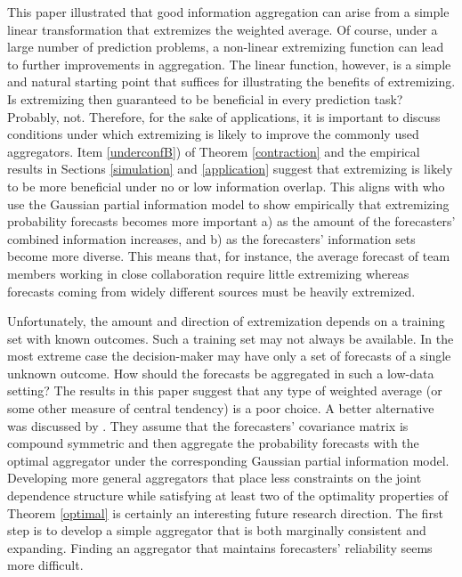 \documentclass[12pt]{article}
\theoremstyle{definition}
\theoremstyle{definition}
\begin{document}
This paper illustrated that good information aggregation can arise from a simple linear transformation that extremizes the weighted average. Of course, under a large number of prediction problems, a non-linear extremizing function can lead to further improvements in aggregation. The linear function, however, is a simple and natural starting point that suffices for illustrating the benefits of extremizing. Is extremizing then guaranteed to be beneficial in every prediction task? Probably, not. 
Therefore, for the sake of applications, it is important to discuss conditions under which extremizing is likely to improve the commonly used aggregators. Item \ref{underconfB}) of Theorem \ref{contraction} and the empirical results in Sections \ref{simulation} and \ref{application} suggest that extremizing is likely to be more beneficial under no or low information overlap. This aligns with  \cite{satopaamodeling} who use the Gaussian partial information model to show empirically that extremizing probability forecasts becomes more important a) as the amount of the forecasters' combined information increases, and b) as the forecasters' information sets become more diverse. This means that, for instance, the average forecast of team members working in close collaboration require little extremizing whereas forecasts coming from widely different sources must be heavily extremized.  




Unfortunately, the amount and direction of extremization depends on a training set with known outcomes. Such a training set may not always be available. In the most extreme case  the decision-maker may have only a set of forecasts of a single unknown outcome. How should the forecasts be aggregated in such a low-data setting? The results in this paper suggest that any type of weighted average (or some other measure of central tendency) is a poor choice. A better alternative was discussed by \cite{satopaamodeling}. They assume that the forecasters' covariance matrix is compound symmetric and then aggregate the probability forecasts with the optimal aggregator under the corresponding Gaussian partial information model. 
 Developing more general aggregators that place less constraints on the joint dependence structure while satisfying at least two of the optimality properties of Theorem \ref{optimal} is certainly an interesting future research direction. The first step is to develop a simple aggregator that is both marginally consistent and expanding. Finding an aggregator that maintains forecasters' reliability seems more difficult. 
\end{document}
